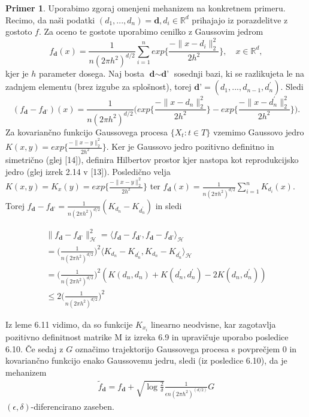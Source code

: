 \documentclass[12pt,a4paper]{amsart}
\theoremstyle{definition} %
\newtheorem{primer}[definicija]{Primer}
\theoremstyle{plain} %
\begin{document}
\begin{primer}
Uporabimo zgoraj omenjeni mehanizem na konkretnem primeru. Recimo, da naši podatki $(d_1,...,d_n) = \textbf{d}, d_i \in \mathbb{R}^d$ prihajajo iz porazdelitve z gostoto $f$. Za oceno te gostote uporabimo cenilko z Gaussovim jedrom
$$
f_{\textbf{d}}(x) = \frac{1}{n(2\pi h^2)^{d/2}} \sum_{i=1}^{n} exp\Big\{\frac{-\|x-d_i\|_{2}^{2}}{2h^2}\Big\},  \quad x \in \mathbb{R}^d,
$$
kjer je $h$ parameter dosega. Naj bosta $\textbf{d} \sim \textbf{d'}$ sosednji bazi, ki se razlikujeta le na zadnjem elementu (brez izgube za splošnost), torej $\textbf{d'} = (d_1,...,d_{n-1},d_{n}^{\prime}) $. Sledi
$$
(f_{\textbf{d}} - f_{\textbf{d'}})(x) = \frac{1}{n(2\pi h^2)^{d/2}} \Big(exp\Big\{\frac{-\|x-d_n\|_{2}^{2}}{2h^2}\Big\}-exp\Big\{\frac{-\|x-d_{n}^{\prime}\|_{2}^{2}}{2h^2}\Big\}\Big).
$$
Za kovariančno funkcijo Gaussovega procesa $\{X_t : t \in T \}$ vzemimo Gaussovo jedro $K(x,y) = exp\{\frac{-\|x-y\|_{2}^{2}}{2h^2}\}$. 
Ker je Gaussovo jedro pozitivno definitno in simetrično (glej [14]), definira Hilbertov prostor kjer nastopa kot reprodukcijsko jedro (glej izrek 2.14 v [13]). Posledično velja $K(x,y) = K_x(y) = exp\{\frac{-\|x-y\|_{2}^{2}}{2h^2}\}$ ter $ f_{\textbf{d}}(x) = \frac{1}{n(2\pi h^2)^{d/2}} \sum_{i=1}^{n} K_{d_i}(x)$. Torej $f_{\textbf{d}} - f_{\textbf{d'}} = \frac{1}{n(2\pi h^2)^{d/2}} (K_{d_n}-K_{d_{n}^{\prime}})$ in sledi

\begin{gather*}
\|f_{\textbf{d}} - f_{\textbf{d'}}\|_{\mathcal{H}}^{2} = \langle f_{\textbf{d}} - f_{\textbf{d'}}, f_{\textbf{d}} - f_{\textbf{d'}} \rangle_{\mathcal{H}}  \\ 
= \Big(\frac{1}{n(2\pi h^2)^{d/2}}\Big)^2 \langle K_{d_n}-K_{d_{n}^{\prime}}, K_{d_n}-K_{d_{n}^{\prime}} \rangle_{\mathcal{H}}  \\
= \Big(\frac{1}{n(2\pi h^2)^{d/2}}\Big)^2 (K(d_n, d_n)+K(d_{n}^{\prime}, d_{n}^{\prime})-2K(d_n, d_{n}^{\prime})) \\ 
\leq 2 \Big(\frac{1}{n(2\pi h^2)^{d/2}}\Big)^2
\end{gather*}

Iz leme 6.11 vidimo, da so funkcije $K_{x_i}$ linearno neodvisne, kar zagotavlja pozitivno definitnost matrike M iz izreka 6.9 in upravičuje uporabo posledice 6.10. Če sedaj z $G$ označimo trajektorijo Gaussovega procesa s povprečjem 0 in kovariančno funkcijo enako Gaussovemu jedru, sledi (iz posledice 6.10), da je mehanizem 
\begin{gather*}
\widetilde{f}_{\textbf{d}} = f_{\textbf{d}} + \sqrt{\log{\frac{2}{\delta}}} \frac{1}{\epsilon n (2\pi h^2)^{(d/2)}}G
\end{gather*}
$(\epsilon, \delta)$-diferencirano zaseben.
\end{primer}
\end{document}
